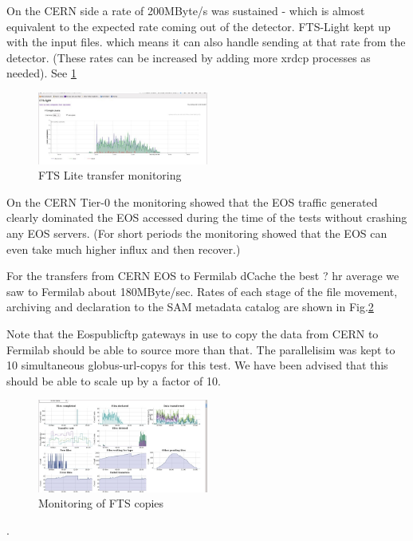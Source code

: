 \documentclass[pdftex,12pt,letter]{article}
\begin{document}
On the CERN side a rate of 200MByte/s was sustained - which is almost equivalent to the expected rate coming out of the detector. FTS-Light kept up with the input files. which means it can also handle sending at that rate from the detector. (These  rates can be increased by adding more xrdcp processes as needed). See \ref{fig:FTSLite}


\begin{figure}[tbh]
  \centering
  \includegraphics[width=0.5\textwidth]{./ReportImages/FTSLite.jpg}
  \caption{FTS Lite transfer monitoring}
  \label{fig:FTSLite}
\end{figure}


On the CERN Tier-0 the monitoring showed that the EOS traffic generated clearly dominated the EOS accessed during the time of the tests without crashing any EOS servers. (For short periods the monitoring showed that the EOS can even take much higher influx and then recover.)

For the transfers from CERN EOS to Fermilab dCache the best ? hr average we saw to Fermilab about 180MByte/sec. Rates of each stage of the file movement, archiving and declaration to the SAM metadata catalog are shown in  Fig.\ref{fig:FTStoFermilab}

Note that the Eospublicftp gateways in use to copy the data from CERN to Fermilab should be able to source more than that. The parallelisim was kept to 10 simultaneous globus-url-copys for this test. We have  been advised that this should be able to scale up by a factor of 10.

\begin{figure}[tbh]
  \centering
  \includegraphics[width=0.5\textwidth]{./ReportImages/FTS.jpg}
  \caption{Monitoring of FTS copies}
  \label{fig:FTStoFermilab}
  
\end{figure}. 
\end{document}
